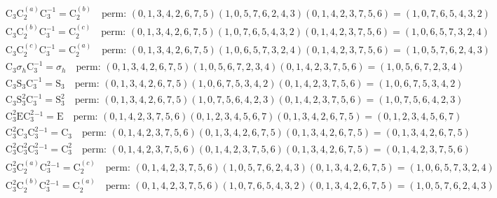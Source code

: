 \begin{align*}
& \mathrm{C}_{3} \mathrm{C}_{2}^{(a)} \mathrm{C}_{3}^{-1} = \mathrm{C}_{2}^{(b)} \quad \text{perm: }(0, 1, 3, 4, 2, 6, 7, 5)(1, 0, 5, 7, 6, 2, 4, 3)(0, 1, 4, 2, 3, 7, 5, 6) = (1, 0, 7, 6, 5, 4, 3, 2) \\
& \mathrm{C}_{3} \mathrm{C}_{2}^{(b)} \mathrm{C}_{3}^{-1} = \mathrm{C}_{2}^{(c)} \quad \text{perm: }(0, 1, 3, 4, 2, 6, 7, 5)(1, 0, 7, 6, 5, 4, 3, 2)(0, 1, 4, 2, 3, 7, 5, 6) = (1, 0, 6, 5, 7, 3, 2, 4) \\
& \mathrm{C}_{3} \mathrm{C}_{2}^{(c)} \mathrm{C}_{3}^{-1} = \mathrm{C}_{2}^{(a)} \quad \text{perm: }(0, 1, 3, 4, 2, 6, 7, 5)(1, 0, 6, 5, 7, 3, 2, 4)(0, 1, 4, 2, 3, 7, 5, 6) = (1, 0, 5, 7, 6, 2, 4, 3) \\
& \mathrm{C}_{3} \sigma_{h} \mathrm{C}_{3}^{-1} = \sigma_{h} \quad \text{perm: }(0, 1, 3, 4, 2, 6, 7, 5)(1, 0, 5, 6, 7, 2, 3, 4)(0, 1, 4, 2, 3, 7, 5, 6) = (1, 0, 5, 6, 7, 2, 3, 4) \\
& \mathrm{C}_{3} \mathrm{S}_{3} \mathrm{C}_{3}^{-1} = \mathrm{S}_{3} \quad \text{perm: }(0, 1, 3, 4, 2, 6, 7, 5)(1, 0, 6, 7, 5, 3, 4, 2)(0, 1, 4, 2, 3, 7, 5, 6) = (1, 0, 6, 7, 5, 3, 4, 2) \\
& \mathrm{C}_{3} \mathrm{S}_{3}^{2} \mathrm{C}_{3}^{-1} = \mathrm{S}_{3}^{2} \quad \text{perm: }(0, 1, 3, 4, 2, 6, 7, 5)(1, 0, 7, 5, 6, 4, 2, 3)(0, 1, 4, 2, 3, 7, 5, 6) = (1, 0, 7, 5, 6, 4, 2, 3) \\
& \mathrm{C}_{3}^{2} \mathrm{E} \mathrm{C}_{3}^{2}^{-1} = \mathrm{E} \quad \text{perm: }(0, 1, 4, 2, 3, 7, 5, 6)(0, 1, 2, 3, 4, 5, 6, 7)(0, 1, 3, 4, 2, 6, 7, 5) = (0, 1, 2, 3, 4, 5, 6, 7) \\
& \mathrm{C}_{3}^{2} \mathrm{C}_{3} \mathrm{C}_{3}^{2}^{-1} = \mathrm{C}_{3} \quad \text{perm: }(0, 1, 4, 2, 3, 7, 5, 6)(0, 1, 3, 4, 2, 6, 7, 5)(0, 1, 3, 4, 2, 6, 7, 5) = (0, 1, 3, 4, 2, 6, 7, 5) \\
& \mathrm{C}_{3}^{2} \mathrm{C}_{3}^{2} \mathrm{C}_{3}^{2}^{-1} = \mathrm{C}_{3}^{2} \quad \text{perm: }(0, 1, 4, 2, 3, 7, 5, 6)(0, 1, 4, 2, 3, 7, 5, 6)(0, 1, 3, 4, 2, 6, 7, 5) = (0, 1, 4, 2, 3, 7, 5, 6) \\
& \mathrm{C}_{3}^{2} \mathrm{C}_{2}^{(a)} \mathrm{C}_{3}^{2}^{-1} = \mathrm{C}_{2}^{(c)} \quad \text{perm: }(0, 1, 4, 2, 3, 7, 5, 6)(1, 0, 5, 7, 6, 2, 4, 3)(0, 1, 3, 4, 2, 6, 7, 5) = (1, 0, 6, 5, 7, 3, 2, 4) \\
& \mathrm{C}_{3}^{2} \mathrm{C}_{2}^{(b)} \mathrm{C}_{3}^{2}^{-1} = \mathrm{C}_{2}^{(a)} \quad \text{perm: }(0, 1, 4, 2, 3, 7, 5, 6)(1, 0, 7, 6, 5, 4, 3, 2)(0, 1, 3, 4, 2, 6, 7, 5) = (1, 0, 5, 7, 6, 2, 4, 3) \\

\end{align*}
